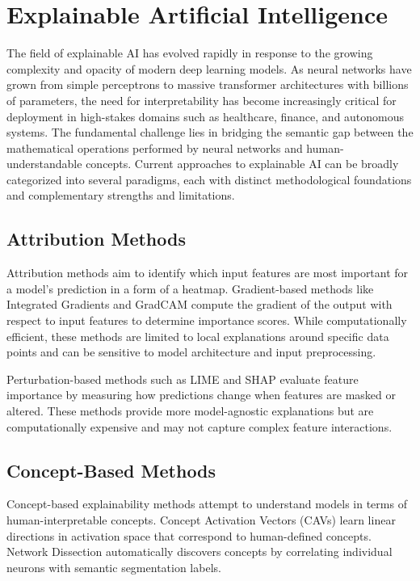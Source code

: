 \documentclass[licencjacka,en]{pracamgr}
\begin{document}
\section{Explainable Artificial Intelligence}

The field of explainable AI has evolved rapidly in response to the growing complexity and opacity of modern deep learning models. As neural networks have grown from simple perceptrons to massive transformer architectures with billions of parameters, the need for interpretability has become increasingly critical for deployment in high-stakes domains such as healthcare, finance, and autonomous systems. The fundamental challenge lies in bridging the semantic gap between the mathematical operations performed by neural networks and human-understandable concepts. Current approaches to explainable AI can be broadly categorized into several paradigms, each with distinct methodological foundations and complementary strengths and limitations.

\subsection{Attribution Methods}

Attribution methods aim to identify which input features are most important for a model's prediction in a form of a heatmap. Gradient-based methods like Integrated Gradients \citep{sundararajan2017axiomaticattributiondeepnetworks} and GradCAM \citep{8237336} compute the gradient of the output with respect to input features to determine importance scores. While computationally efficient, these methods are limited to local explanations around specific data points and can be sensitive to model architecture and input preprocessing.

Perturbation-based methods such as LIME \citep{ribeiro2016whyitrustyou} and SHAP \citep{lundberg2017unifiedapproachinterpretingmodel} evaluate feature importance by measuring how predictions change when features are masked or altered. These methods provide more model-agnostic explanations but are computationally expensive and may not capture complex feature interactions.

\subsection{Concept-Based Methods}

Concept-based explainability methods attempt to understand models in terms of human-interpretable concepts. Concept Activation Vectors (CAVs) \citep{kim2018interpretabilityfeatureattributionquantitative} learn linear directions in activation space that correspond to human-defined concepts. Network Dissection \citep{bau2017networkdissectionquantifyinginterpretability} automatically discovers concepts by correlating individual neurons with semantic segmentation labels.
\end{document}
